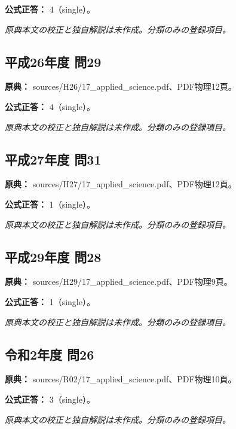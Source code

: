 \textbf{公式正答：} 4（single）。

\par\textit{原典本文の校正と独自解説は未作成。分類のみの登録項目。}

\subsection{平成26年度 問29}
\label{q:h26-reg-applied-29}

\noindent\textbf{原典：} sources/H26/17\_applied\_science.pdf、PDF物理12頁。

\textbf{公式正答：} 4（single）。

\par\textit{原典本文の校正と独自解説は未作成。分類のみの登録項目。}

\subsection{平成27年度 問31}
\label{q:h27-reg-applied-31}

\noindent\textbf{原典：} sources/H27/17\_applied\_science.pdf、PDF物理12頁。

\textbf{公式正答：} 1（single）。

\par\textit{原典本文の校正と独自解説は未作成。分類のみの登録項目。}

\subsection{平成29年度 問28}
\label{q:h29-reg-applied-28}

\noindent\textbf{原典：} sources/H29/17\_applied\_science.pdf、PDF物理9頁。

\textbf{公式正答：} 1（single）。

\par\textit{原典本文の校正と独自解説は未作成。分類のみの登録項目。}

\subsection{令和2年度 問26}
\label{q:r02-reg-applied-26}

\noindent\textbf{原典：} sources/R02/17\_applied\_science.pdf、PDF物理10頁。

\textbf{公式正答：} 3（single）。

\par\textit{原典本文の校正と独自解説は未作成。分類のみの登録項目。}

